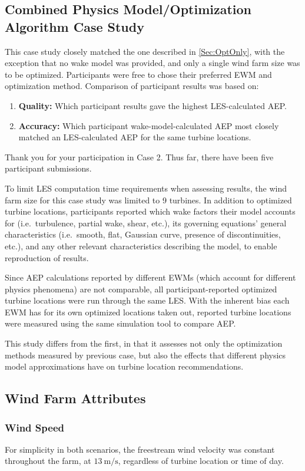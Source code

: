 \documentclass[]{aiaa-tc}
\begin{document}
\subsection{Combined Physics Model/Optimization Algorithm Case Study}
\label{Sec:Cmbnd}
This case study closely matched the one described in \cref{Sec:OptOnly}, with the exception that no wake model was provided, and only a single wind farm size was to be optimized. Participants were free to chose their preferred EWM and optimization method. Comparison of participant results was based on:
\begin{enumerate}
	\item \textbf{Quality:} Which participant results gave the highest LES-calculated AEP.
	\item \textbf{Accuracy:} Which participant wake-model-calculated AEP most closely matched an LES-calculated AEP for the same turbine locations.
\end{enumerate}Thank you for your participation in Case 2. Thus far, there have been five participant submissions.

To limit LES computation time requirements when assessing results, the wind farm size for this case study was limited to 9 turbines. In addition to optimized turbine locations, participants reported which wake factors their model accounts for (i.e.~turbulence, partial wake, shear, etc.), its governing equations' general characteristics (i.e.~smooth, flat, Gaussian curve, presence of discontinuities, etc.), and any other relevant characteristics describing the model, to enable reproduction of results.

Since AEP calculations reported by different EWMs (which account for different physics phenomena) are not comparable, all participant-reported optimized turbine locations were run through the same LES. With the inherent bias each EWM has for its own optimized locations taken out, reported turbine locations were measured using the same simulation tool to compare AEP.

This study differs from the first, in that it assesses not only the optimization methods measured by previous case, but also the effects that different physics model approximations have on turbine location recommendations.

\subsection{Wind Farm Attributes}

\subsubsection{Wind Speed}
For simplicity in both scenarios, the freestream wind velocity was constant throughout the farm, at $13\ \textrm{m/s}$, regardless of turbine location or time of day.
\end{document}
